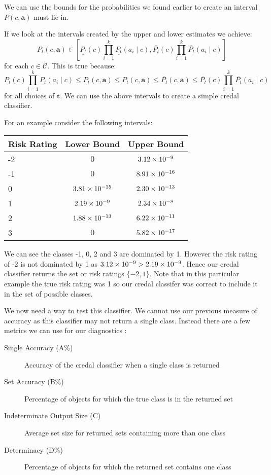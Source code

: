 We can use the bounds for the probabilities we found earlier to create an interval $P(c, \mathbf{a})$ must lie in. 

If we look at the intervals created by the upper and lower estimates we achieve:
\begin{equation}
	P_t(c, \mathbf{a}) \in \left[ \underline{P_t}(c)\prod_{i=1}^k \underline{P_t}(a_i \mid c), \overline{P_t}(c)\prod_{i=1}^k \overline{P_t}(a_i \mid c) \right]
\end{equation}
for each $c \in \mathcal{C}$.
This is true because:
\begin{equation}
\underline{P_t}(c)\prod_{i=1}^k \underline{P_t}(a_i \mid c) \leq \underline{P_t}(c, \mathbf{a}) \leq P_t(c, \mathbf{a}) \leq \overline{P_t}(c, \mathbf{a}) \leq \overline{P_t}(c)\prod_{i=1}^k \overline{P_t}(a_i \mid c)
\end{equation}
for all choices of $\mathbf{t}$.
We can use the above intervals to create a simple credal classifier.

For an example consider the following intervals:
\begin{center}
	\begin{tabular}{l|c c}
	Risk Rating & Lower Bound & Upper Bound \\
	\hline
	-2          & $0$              & ${3.12}\times 10^{-9}$  \\
	-1          & $0$              & ${8.91}\times 10^{-16}$ \\
	0           & ${3.81}\times 10^{-15}$ & ${2.30}\times 10^{-13}$ \\
	1           & ${2.19}\times 10^{-9}$  & ${2.34}\times 10^{-8}$  \\
	2           & ${1.88}\times 10^{-13}$ & ${6.22}\times 10^{-11}$ \\
	3           & $0$              & ${5.82}\times 10^{-17}$ \\
	\end{tabular}
\end{center}
We can see the classes -1, 0, 2 and 3 are dominated by 1.
However the risk rating of -2 is not dominated by 1 as ${3.12}\times 10^{-9} > {2.19}\times 10^{-9}$.
Hence our credal classifier returns the set or risk ratings $\{-2, 1\}$.
Note that in this particular example the true risk rating was 1 so our credal classifer was correct to include it in the set of possible classes.

We now need a way to test this classifier.
We cannot use our previous measure of accuracy as this classifier may not return a single class.
Instead there are a few metrics we can use for our diagnostics \cite{Antonucci11}:
\begin{description}
	\item[Single Accuracy (A\%)] Accuracy of the credal classifier when a single class is returned
	\item[Set Accuracy (B\%)] Percentage of objects for which the true class is in the returned set
	\item[Indeterminate Output Size (C)] Average set size for returned sets containing more than one class
	\item[Determinacy (D\%)] Percentage of objects for which the returned set contains one class
\end{description}

